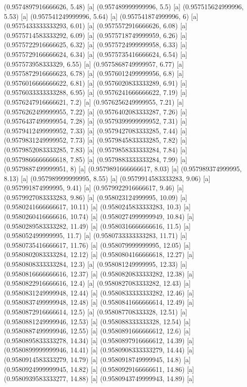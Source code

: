 {{{(0.9574897916666626, 5.48) [a] 
(0.957489999999996, 5.5) [a] 
(0.957515624999996, 5.53) [a] 
(0.957541249999996, 5.64) [a] 
(0.957541874999996, 6) [a] 
(0.9575433333333293, 6.01) [a] 
(0.9575572916666626, 6.08) [a] 
(0.9575714583333292, 6.09) [a] 
(0.9575718749999959, 6.26) [a] 
(0.9575722916666625, 6.32) [a] 
(0.9575724999999958, 6.33) [a] 
(0.9575729166666624, 6.34) [a] 
(0.9575735416666624, 6.54) [a] 
(0.957573958333329, 6.55) [a] 
(0.9575868749999957, 6.77) [a] 
(0.9575872916666623, 6.78) [a] 
(0.9576012499999956, 6.8) [a] 
(0.9576016666666622, 6.81) [a] 
(0.9576020833333289, 6.91) [a] 
(0.9576033333333288, 6.95) [a] 
(0.9576241666666622, 7.19) [a] 
(0.9576247916666621, 7.2) [a] 
(0.9576256249999955, 7.21) [a] 
(0.9576262499999955, 7.22) [a] 
(0.9576402083333287, 7.26) [a] 
(0.9576437499999954, 7.28) [a] 
(0.9579399999999952, 7.31) [a] 
(0.9579412499999952, 7.33) [a] 
(0.9579427083333285, 7.44) [a] 
(0.9579831249999952, 7.73) [a] 
(0.9579845833333285, 7.82) [a] 
(0.9579852083333285, 7.83) [a] 
(0.9579858333333284, 7.84) [a] 
(0.9579866666666618, 7.85) [a] 
(0.9579883333333284, 7.99) [a] 
(0.9579887499999951, 8) [a] 
(0.9579891666666617, 8.03) [a] 
(0.957989374999995, 8.13) [a] 
(0.957989999999995, 8.55) [a] 
(0.9579914583333283, 9.06) [a] 
(0.957991874999995, 9.41) [a] 
(0.9579922916666617, 9.46) [a] 
(0.9579927083333283, 9.86) [a] 
(0.958023124999995, 10.09) [a] 
(0.9580241666666617, 10.11) [a] 
(0.9580245833333283, 10.3) [a] 
(0.9580260416666616, 10.74) [a] 
(0.9580274999999949, 10.84) [a] 
(0.9580289583333282, 11.49) [a] 
(0.9580316666666616, 11.5) [a] 
(0.958052499999995, 11.7) [a] 
(0.9580733333333283, 11.71) [a] 
(0.9580735416666617, 11.76) [a] 
(0.958079999999995, 12.05) [a] 
(0.9580802083333284, 12.12) [a] 
(0.9580804166666618, 12.27) [a] 
(0.9580808333333284, 12.3) [a] 
(0.958081249999995, 12.33) [a] 
(0.9580816666666616, 12.37) [a] 
(0.9580820833333282, 12.38) [a] 
(0.9580822916666616, 12.4) [a] 
(0.9580827083333282, 12.43) [a] 
(0.9580831249999948, 12.44) [a] 
(0.9580833333333282, 12.46) [a] 
(0.9580837499999948, 12.48) [a] 
(0.9580841666666614, 12.49) [a] 
(0.9580872916666614, 12.5) [a] 
(0.958087708333328, 12.51) [a] 
(0.9580881249999946, 12.53) [a] 
(0.958088333333328, 12.54) [a] 
(0.9580887499999946, 12.55) [a] 
(0.9580891666666612, 12.6) [a] 
(0.9580895833333278, 14.34) [a] 
(0.9580897916666612, 14.39) [a] 
(0.9580899999999946, 14.41) [a] 
(0.9580908333333279, 14.44) [a] 
(0.9580914583333279, 14.79) [a] 
(0.9580918749999945, 14.8) [a] 
(0.9580924999999945, 14.82) [a] 
(0.9580929166666611, 14.86) [a] 
(0.9580939583333277, 14.88) [a] 
(0.9580943749999943, 14.89) [a] 
}}}
